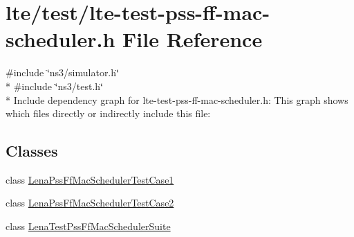 \hypertarget{lte-test-pss-ff-mac-scheduler_8h}{}\section{lte/test/lte-\/test-\/pss-\/ff-\/mac-\/scheduler.h File Reference}
\label{lte-test-pss-ff-mac-scheduler_8h}
{\ttfamily \#include \char`\"{}ns3/simulator.\+h\char`\"{}}\\*
{\ttfamily \#include \char`\"{}ns3/test.\+h\char`\"{}}\\*
Include dependency graph for lte-\/test-\/pss-\/ff-\/mac-\/scheduler.h\+:
This graph shows which files directly or indirectly include this file\+:
\subsection*{Classes}
\begin{DoxyCompactItemize}
\item 
class \hyperlink{classLenaPssFfMacSchedulerTestCase1}{Lena\+Pss\+Ff\+Mac\+Scheduler\+Test\+Case1}
\item 
class \hyperlink{classLenaPssFfMacSchedulerTestCase2}{Lena\+Pss\+Ff\+Mac\+Scheduler\+Test\+Case2}
\item 
class \hyperlink{classLenaTestPssFfMacSchedulerSuite}{Lena\+Test\+Pss\+Ff\+Mac\+Scheduler\+Suite}
\end{DoxyCompactItemize}
